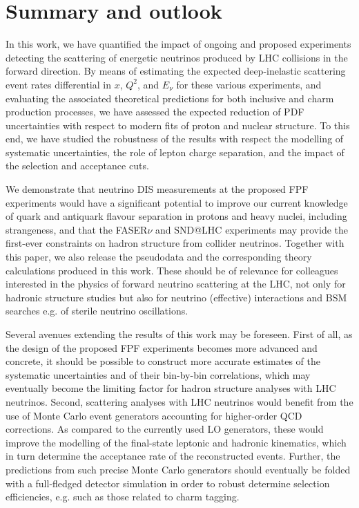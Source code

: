\section{Summary and outlook}
\label{sec:summary}

In this work, we have quantified the impact of ongoing and proposed
experiments detecting the scattering of energetic neutrinos produced
by LHC collisions in the forward direction.
%
By means of estimating the expected deep-inelastic scattering
event rates differential
in $x$, $Q^2$, and $E_\nu$ for these various experiments, and
evaluating the associated theoretical predictions for
both inclusive and charm production processes, we have
assessed the expected reduction of PDF uncertainties with respect
to modern fits of proton and nuclear structure.
%
To this end, we have studied the robustness of the results
with respect the modelling of systematic uncertainties, the role of lepton
charge separation, and the impact of the selection and acceptance cuts.

We demonstrate that neutrino DIS measurements at the proposed FPF
experiments would have a significant potential to improve our current
knowledge of quark and antiquark flavour separation in protons
and heavy nuclei, including strangeness,
and that the FASER$\nu$ and SND@LHC
experiments may provide the first-ever
constraints on hadron structure from collider neutrinos.
%
Together with this paper, we also
release the pseudodata and the corresponding theory
calculations produced in this work.
%
These should be of relevance for colleagues interested in the physics
of forward
neutrino scattering at the LHC, not only for hadronic structure studies
but also for neutrino (effective)
interactions and BSM searches e.g. of sterile neutrino oscillations.

Several avenues extending the results of this work may be foreseen.
%
First of all, as the design of the proposed FPF experiments
becomes more advanced and concrete, it should be possible
to construct more accurate estimates of the systematic
uncertainties and of their bin-by-bin correlations,
which may eventually become the limiting factor
for hadron structure analyses with LHC neutrinos.
%
Second, scattering analyses with LHC neutrinos would benefit from
the use of Monte Carlo event generators accounting
for higher-order QCD corrections.
%
As compared to the currently used LO generators,
these would improve the modelling of the final-state leptonic
and hadronic kinematics, which in turn determine the acceptance rate
of the reconstructed events.
%
Further, the predictions from such precise Monte Carlo generators
should eventually be folded with a full-fledged detector simulation
in order to robust determine selection efficiencies, e.g.
such as those related to charm tagging.

